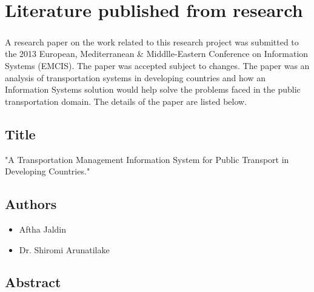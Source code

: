 
\chapter*{Literature published from research}

\paragraph{} A research paper on the work related to this research project was submitted to the 2013 European, Mediterranean \& Middlle-Eastern Conference on Information Systems (EMCIS). The paper was accepted subject to changes. The paper was an analysis of transportation systems in developing countries and how an Information Systems solution would help solve the problems faced in the public transportation domain. The details of the paper are listed below.

\section*{Title}

"A Transportation Management Information System for Public Transport in Developing Countries."

\section*{Authors} 

\begin{itemize}
\item Aftha Jaldin
\item Dr. Shiromi Arunatilake
\end{itemize}

\section*{Abstract}

